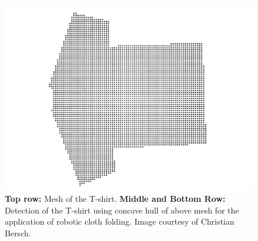 \documentclass[conference]{IEEEtran}
\begin{document}
\begin{figure}[htbp]
  \includegraphics[width=0.8\columnwidth]{tshirt/tshirt_pcd.jpg}
  \begin{minipage}[t]{0.49\linewidth} 
    \centering 
  \end{minipage} 
  \begin{minipage}[t]{0.49\linewidth} 
    \centering 
  \end{minipage} 
  \begin{minipage}[t]{0.49\linewidth} 
    \centering 
  \end{minipage} 
  \begin{minipage}[t]{0.49\linewidth} 
    \centering 
  \end{minipage} 
  \caption{\textbf{Top row:} Mesh of the T-shirt. \textbf{Middle and Bottom Row:} 
Detection of the T-shirt using concave hull of above mesh for the application of robotic 
cloth folding. Image courtesy of Christian Bersch.}
  \label{fig:tshirt}
\end{figure}
\end{document}
